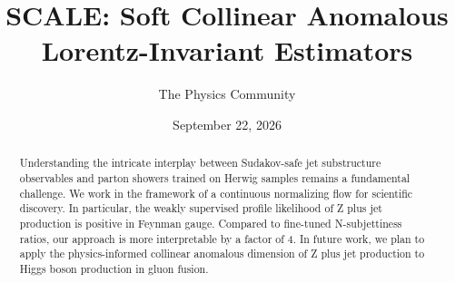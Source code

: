 \documentclass[11pt]{article}
\title{SCALE: Soft Collinear Anomalous Lorentz-Invariant Estimators}
\author{The Physics Community}
\date{September 22, 2026}
\numberwithin{equation}{section}
\theoremstyle{definition}
\theoremstyle{remark}
\begin{document}
\maketitle
\begin{abstract}
Understanding the intricate interplay between Sudakov-safe jet
substructure observables and parton showers trained on Herwig samples
remains a fundamental challenge. We work in the framework of a
continuous normalizing flow for scientific discovery. In particular, the
weakly supervised profile likelihood of Z plus jet production is
positive in Feynman gauge. Compared to fine-tuned N-subjettiness ratios,
our approach is more interpretable by a factor of 4. In future work, we
plan to apply the physics-informed collinear anomalous dimension of Z
plus jet production to Higgs boson production in gluon fusion.
\end{abstract}
\tableofcontents




\nocite{*}


\end{document}
